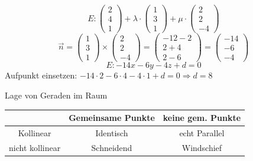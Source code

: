 \begin{example}
    $$E: \begin{pmatrix} 2 \\ 4 \\ 1 \end{pmatrix} + \lambda \cdot \begin{pmatrix} 1 \\ 3 \\ 1 \end{pmatrix} + \mu \cdot \begin{pmatrix} 2 \\ 2 \\ -4 \end{pmatrix}$$
    $$\vec{n} = \begin{pmatrix} 1 \\ 3 \\ 1 \end{pmatrix} \times \begin{pmatrix} 2 \\ 2 \\ -4 \end{pmatrix} = \begin{pmatrix} -12 -2 \\ 2 + 4 \\ 2 - 6 \end{pmatrix} = \begin{pmatrix} -14 \\ -6 \\ -4 \end{pmatrix}$$
    $$E: -14x - 6y - 4z + d = 0$$
    Aufpunkt einsetzen: $-14 \cdot 2 - 6 \cdot 4 - 4 \cdot 1 + d = 0 \Rightarrow d = 8$
\end{example}

\begin{theorem}{Lage} von Geraden im Raum\\
    \vspace*{2mm}
    \begin{tabular}{c|c|c|}
        & Gemeinsame Punkte & keine gem. Punkte \\
        \hline
        Kollinear & Identisch & echt Parallel \\
        \hline
        nicht kollinear & Schneidend & Windschief \\
        \hline
    \end{tabular}
\end{theorem}





